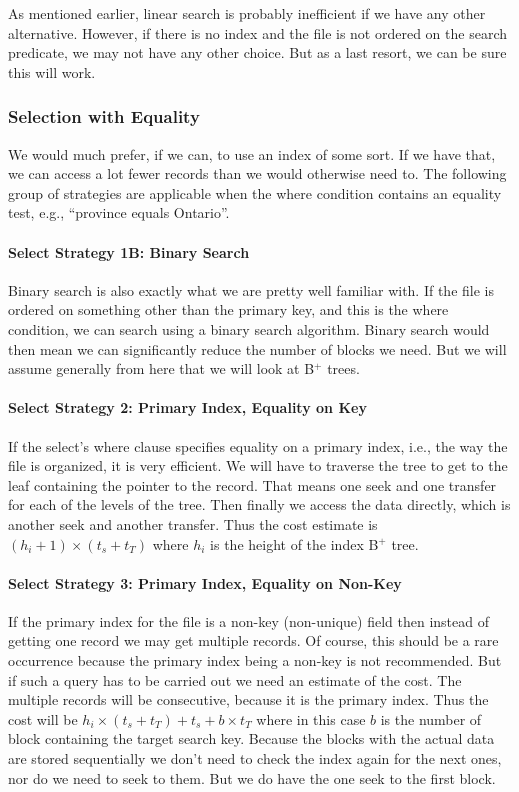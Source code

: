\documentclass[a4paper]{report}
\begin{document}
As mentioned earlier, linear search is probably inefficient if we have any other alternative. However, if there is no index and the file is not ordered on the search predicate, we may not have any other choice. But as a last resort, we can be sure this will work.

\subsubsection*{Selection with Equality}

We would much prefer, if we can, to use an index of some sort. If we have that, we can access a lot fewer records than we would otherwise need to. The following group of strategies are applicable when the where condition contains an equality test, e.g., ``province equals Ontario''.

\paragraph{Select Strategy 1B: Binary Search}
Binary search is also exactly what we are pretty well familiar with. If the file is ordered on something other than the primary key, and this is the where condition, we can search using a binary search algorithm. Binary search would then mean we can significantly reduce the number of blocks we need. But we will assume generally from here that we will look at B$^{+}$ trees.

\paragraph{Select Strategy 2: Primary Index, Equality on Key}
If the select's where clause specifies equality on a primary index, i.e., the way the file is organized, it is very efficient. We will have to traverse the tree to get to the leaf containing the pointer to the record. That means one seek and one transfer for each of the levels of the tree. Then finally we access the data directly, which is another seek and another transfer. Thus the cost estimate is $(h_{i} + 1) \times (t_{s} + t_{T})$ where $h_{i}$ is the height of the index B$^{+}$ tree.

\paragraph{Select Strategy 3: Primary Index, Equality on Non-Key}
If the primary index for the file is a non-key (non-unique) field then instead of getting one record we may get multiple records. Of course, this should be a rare occurrence because the primary index being a non-key is not recommended. But if such a query has to be carried out we need an estimate of the cost. The multiple records will be consecutive, because it is the primary index. Thus the cost will be $h_{i} \times (t_{s} + t_{T}) + t_{s} + b \times t_{T}$ where in this case $b$ is the number of block containing the target search key. Because the blocks with the actual data are stored sequentially we don't need to check the index again for the next ones, nor do we need to seek to them. But we do have the one seek to the first block.
\end{document}
